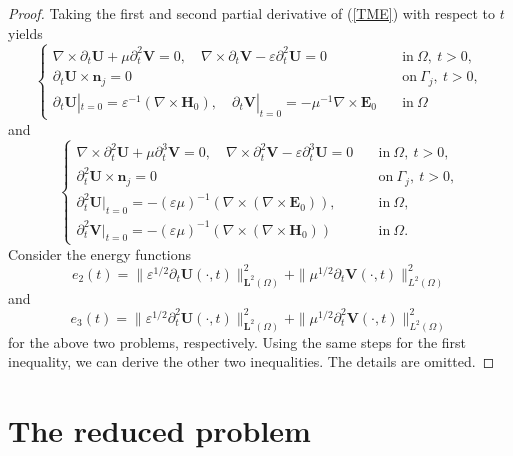 \documentclass[11pt,reqno]{amsart}
\numberwithin{equation}{section}
\begin{document}
\begin{proof}
Taking the first and second partial derivative of (\ref{TME}) with respect to $t$ yields
\begin{equation*}
\left\{
\begin{array}{ll}
\nabla \times \partial_t \boldsymbol U+ \mu \partial_t^2 \boldsymbol V=0, \quad
\nabla \times \partial_t \boldsymbol V -\varepsilon \partial_t^2 \boldsymbol U=0
\quad &\text{in} ~  \Omega, ~  t >0,\\
\partial_t \boldsymbol U \times \boldsymbol n_j =0 \quad  &\text{on} ~\Gamma_j,
~ t >0, \\
\partial_t \boldsymbol U|_{t=0}= \varepsilon^{-1} (\nabla \times \boldsymbol
H_0), \quad  \partial_t \boldsymbol V|_{t=0}= -\mu^{-1} \nabla \times
\boldsymbol E_0 \quad &\text{in}~\Omega
\end{array}
\right.
\end{equation*}
 and
 \begin{equation*}
\left\{
\begin{array}{ll}
\nabla \times \partial^2_t \boldsymbol U+ \mu \partial_t^3 \boldsymbol V=0,
\quad \nabla \times \partial^2_t \boldsymbol V -\varepsilon \partial_t^3
\boldsymbol U=0
\quad &\text{in} ~ \Omega, ~  t >0,\\
\partial^2_t \boldsymbol U \times \boldsymbol n_j =0 \quad  &\text{on}
~\Gamma_j, ~ t >0, \\
\partial^2_t \boldsymbol U|_{t=0}= - (\varepsilon \mu) ^{-1} (\nabla \times
(\nabla \times \boldsymbol E_0)), \quad&\text{in}~\Omega, \\
\partial^2_t \boldsymbol V|_{t=0}=-(\varepsilon \mu)^{-1} (\nabla \times
(\nabla \times \boldsymbol H_0)) \quad&\text{in}~\Omega.
\end{array}
\right.
\end{equation*}
Consider the energy functions
\[
e_2 (t)=\| \varepsilon^{1/2} \partial_t \boldsymbol U (\cdot,
t)\|^2_{\boldsymbol L^2 (\Omega)} +\|\mu ^{1/2} \partial_t \boldsymbol V (\cdot,
t)\|^2_{L^2(\Omega)}
\]
and
\[
e_3 (t)=\| \varepsilon^{1/2} \partial^2_t \boldsymbol U (\cdot,
t)\|^2_{\boldsymbol L^2 (\Omega)} +\|\mu ^{1/2} \partial^2_t \boldsymbol V
(\cdot, t)\|^2_{L^2(\Omega)}
\]
for the above two problems, respectively. Using the same steps for the first
inequality, we can derive the other two inequalities. The details are omitted. 
\end{proof}

\section{The reduced problem}\label{rp}
\end{document}
